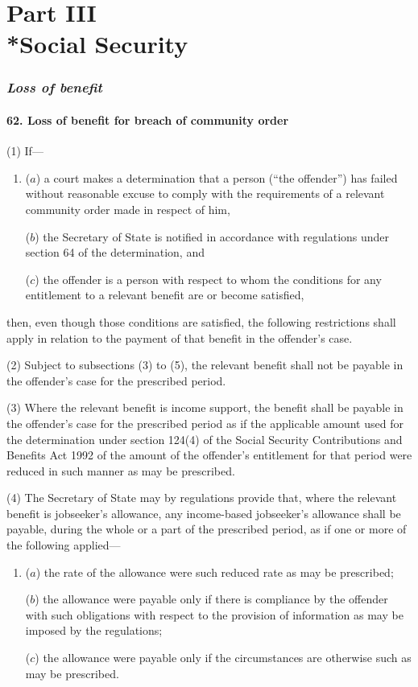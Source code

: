 \documentclass[12pt,a4paper]{article}
\begin{document}
\part[Part III --- Social Security]{Part III\\*Social Security}

\renewcommand\parthead{--- Part III}

\section{\itshape Loss of benefit}

\subsection{62. Loss of benefit for breach of community order}

(1) If—
\begin{enumerate}\item[]
($a$) a court makes a determination that a person (“the offender”) has failed without reasonable excuse to comply with the requirements of a relevant community order made in respect of him,

($b$) the Secretary of State is notified in accordance with regulations under section 64 of the determination, and

($c$) the offender is a person with respect to whom the conditions for any entitlement to a relevant benefit are or become satisfied,
\end{enumerate}
then, even though those conditions are satisfied, the following restrictions shall apply in relation to the payment of that benefit in the offender’s case.

(2) Subject to subsections (3)  to (5), the relevant benefit shall not be payable in the offender’s case for the prescribed period.

(3) Where the relevant benefit is income support, the benefit shall be payable in the offender’s case for the prescribed period as if the applicable amount used for the determination under section 124(4)  of the Social Security Contributions and Benefits Act 1992 of the amount of the offender’s entitlement for that period were reduced in such manner as may be prescribed.

(4) The Secretary of State may by regulations provide that, where the relevant benefit is jobseeker’s allowance, any income-based jobseeker’s allowance shall be payable, during the whole or a part of the prescribed period, as if one or more of the following applied—
\begin{enumerate}\item[]
($a$) the rate of the allowance were such reduced rate as may be prescribed;

($b$) the allowance were payable only if there is compliance by the offender with such obligations with respect to the provision of information as may be imposed by the regulations;

($c$) the allowance were payable only if the circumstances are otherwise such as may be prescribed.
\end{enumerate}
\end{document}
